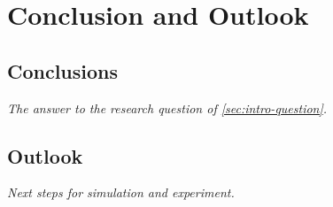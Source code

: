 \chapter{Conclusion and Outlook}
\label{chapter:conclusion}

\section{Conclusions}
\label{sec:co-conclusions}
\emph{The answer to the research question of \cref{sec:intro-question}.}

\section{Outlook}
\label{sec:co-outlook}
\emph{Next steps for simulation and experiment.}
